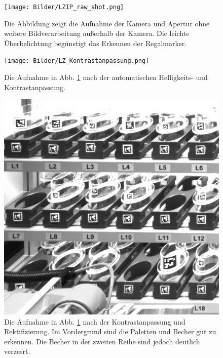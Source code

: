     \begin{figure}
        \caption[Bildaufnahme aus der Lagerzelle von der Übersichtskamera.]
        {\small Die Abbildung zeigt die Aufnahme der Kamera und Apertur ohne weitere Bildverarbeitung außerhalb der Kamera. Die leichte Überbelichtung begünstigt das Erkennen der Regalmarker.}\label{fig:figure12}
        \texttt{[image: Bilder/LZIP\_raw\_shot.png]}
        \centering
    \end{figure}

    \begin{figure}
        \caption[Bildaufnahme aus der Lagerzelle nach der Kontrastanpassung.]
        {\small Die Aufnahme in Abb. \ref{fig:figure12} nach der automatischen Helligkeits- und Kontrastanpassung.}\label{fig:figure13}
        \texttt{[image: Bilder/LZ\_Kontrastanpassung.png]}
        \centering
    \end{figure}

    \begin{figure}
        \caption[Bild aus der Lagerzelle nach der Rektifizierung und Zuschnitt auf relevanten Regalbereich]
        {\small Die Aufnahme in Abb. \ref{fig:figure12} nach der Kontrastanpassung und Rektifizierung. Im Vordergrund sind die Paletten und Becher gut zu erkennen. Die Becher in der zweiten Reihe sind jedoch deutlich verzerrt.}\label{fig:figure14}
        \includegraphics[width = \textwidth]{Bilder/LZ_transformed.png}
        \centering
    \end{figure}

